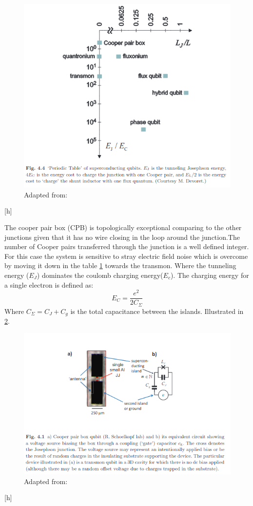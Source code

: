 \documentclass[12pt]{article}
\numberwithin{equation}{subsection}
\begin{document}
\begin{figure}[h]
\includegraphics[scale=0.6]{images/47-periodic.png}
\caption{Adapted from: \cite{Girvin2015CircuitQS}}
\label{47-periodic}
\end{figure}[h]

The cooper pair box (CPB) is topologically exceptional comparing to the other junctions given that it has no wire closing in the loop around the junction.The number of Cooper pairs transferred through the junction is a well defined integer. For this case the system is sensitive to stray electric field noise which is overcome by moving it down in the table \ref{47-periodic} towards the transmon. Where the tunneling energy ($E_J$) dominates the coulomb charging energy($E_c$).
The charging energy for a single electron is defined as:
\begin{equation}
    E_C = \frac{e^2}{2C_\Sigma}
\end{equation}
Where $C_\Sigma = C_J+C_g$ is the total capacitance between the islands. Illustrated in \ref{45-cpb}.

\begin{figure}[h]
\includegraphics[scale=0.6]{images/45-cpb.png}
\caption{Adapted from: \cite{Girvin2015CircuitQS}}
\label{45-cpb}
\end{figure}[h]
\end{document}

